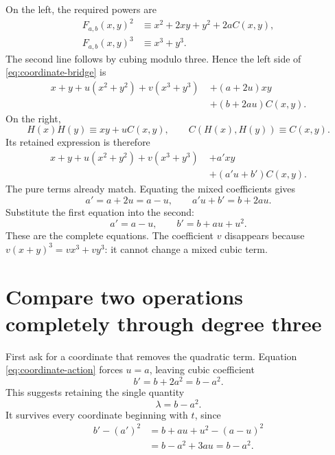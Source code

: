\documentclass[11pt,letterpaper]{article}
\numberwithin{equation}{section}
\theoremstyle{definition}\newtheorem{example}[theorem]{Example}
\begin{document}
On the left, the required powers are
\begin{align*}
 F_{a,b}(x,y)^2&\equiv x^2+2xy+y^2+2aC(x,y),\\
 F_{a,b}(x,y)^3&\equiv x^3+y^3.
\end{align*}
The second line follows by cubing modulo three. Hence the left side of \eqref{eq:coordinate-bridge} is
\begin{equation*}
 \begin{split}
 x+y+u(x^2+y^2)+v(x^3+y^3)\;&+(a+2u)xy\\
 &+(b+2au)C(x,y).
 \end{split}
\end{equation*}
On the right,
\[
 H(x)H(y)\equiv xy+uC(x,y),\qquad
 C(H(x),H(y))\equiv C(x,y).
\]
Its retained expression is therefore
\begin{equation*}
 \begin{split}
 x+y+u(x^2+y^2)+v(x^3+y^3)\;&+a'xy\\
 &+(a'u+b')C(x,y).
 \end{split}
\end{equation*}
The pure terms already match. Equating the mixed coefficients gives
\[
 a'=a+2u=a-u,\qquad a'u+b'=b+2au.
\]
Substitute the first equation into the second:
\begin{equation}\label{eq:coordinate-action}
 \boxed{\quad a'=a-u,\qquad b'=b+au+u^2.\quad}
\end{equation}
These are the complete equations. The coefficient \(v\) disappears because \(v(x+y)^3=vx^3+vy^3\): it cannot change a mixed cubic term.

\section{Compare two operations completely through degree three}\label{sec:classification}

First ask for a coordinate that removes the quadratic term. Equation \eqref{eq:coordinate-action} forces \(u=a\), leaving cubic coefficient
\[
 b'=b+2a^2=b-a^2.
\]
This suggests retaining the single quantity
\begin{equation}\label{eq:lambda}
 \lambda=b-a^2.
\end{equation}
It survives every coordinate beginning with \(t\), since
\begin{align*}
 b'-(a')^2
 &=b+au+u^2-(a-u)^2\\
 &=b-a^2+3au=b-a^2.
\end{align*}
\end{document}
